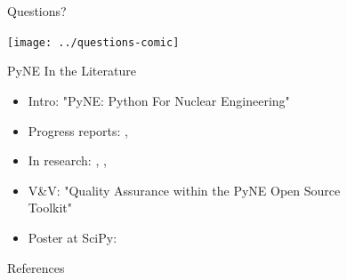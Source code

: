 \documentclass[xcolor=x11names,compress]{beamer}
\renewcommand{\(}{\begin{columns}}
\renewcommand{\)}{\end{columns}}
\newcommand{\<}[1]{\begin{column}{#1}}
\renewcommand{\>}{\end{column}}
\begin{document}
\section*{}
\begin{frame}[fragile]{Questions?}

    \begin{center}
    \texttt{[image: ../questions-comic]}  
    \end{center}
  
\end{frame}

\begin{frame}[fragile]{PyNE In the Literature}

    \begin{itemize}
    \item Intro: "PyNE: Python For Nuclear Engineering" \cite{pyne_intro}
    \item Progress reports: \cite{scopatz_pyne}, \cite{pyne_progress}
    \item In research: \cite{Biondo2014}, \cite{MarquezDamian2014280}, \cite{Scopatz2013a}
    \item V\&V: "Quality Assurance within the PyNE Open Source \\Toolkit" \cite{pyne_vnv}
    \item Poster at SciPy: \cite{scipy}
    \end{itemize}
  
\end{frame}
\begin{frame}[allowframebreaks]{References}
	
	
\end{frame}
\end{document}
